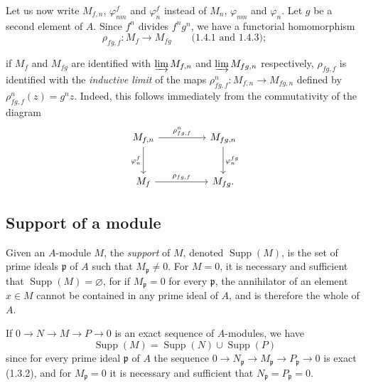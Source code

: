 \begin{env}[1.6.2]
\label{0.1.6.2}
Let us now write $M_{f,n}$, $\varphi_{nm}^f$ and $\varphi_n^f$ instead of
$M_n$, $\varphi_{nm}$ and $\varphi_n$. Let $g$ be a second element of $A$. Since
$f^n$ divides $f^ng^n$, we have a functorial homomorphism
\[
  \rho_{fg,f}:M_f\longrightarrow M_{fg}\qquad\text{(1.4.1 and 1.4.3)};
\]


if $M_f$ and $M_{fg}$ are identified with $\varinjlim M_{f,n}$ and
$\varinjlim M_{fg,n}$ respectively, $\rho_{fg,f}$ is identified with the
\emph{inductive limit} of the maps
$\rho_{fg,f}^n:M_{f,n}\to M_{fg,n}$ defined by
$\rho_{fg,f}^n(z)=g^nz$. Indeed, this follows immediately from the
commutativity of the diagram
\[
\begin{tikzcd}[column sep=huge,row sep=large]
M_{f,n} \arrow[r,"\rho_{fg,f}^n"] \arrow[d,"\varphi_n^f"']
  & M_{fg,n} \arrow[d,"\varphi_n^{fg}"] \\
M_f \arrow[r,"\rho_{fg,f}"]
  & M_{fg}.
\end{tikzcd}
\]
\end{env}

\subsection{Support of a module}
\label{subsection:0.1.7}

\begin{env}[1.7.1]
\label{0.1.7.1}
Given an $A$-module $M$, the \emph{support} of $M$, denoted
$\operatorname{Supp}(M)$, is the set of prime ideals $\mathfrak p$ of $A$
such that $M_{\mathfrak p}\neq0$. For $M=0$, it is necessary and sufficient that
$\operatorname{Supp}(M)=\varnothing$, for if $M_{\mathfrak p}=0$ for every
$\mathfrak p$, the annihilator of an element $x\in M$ cannot be contained in
any prime ideal of $A$, and is therefore the whole of $A$.
\end{env}

\begin{env}[1.7.2]
\label{0.1.7.2}
If $0\to N\to M\to P\to0$ is an exact sequence of $A$-modules, we have
\[
  \operatorname{Supp}(M)=\operatorname{Supp}(N)\cup\operatorname{Supp}(P)
\]
since for every prime ideal $\mathfrak p$ of $A$ the sequence
$0\to N_{\mathfrak p}\to M_{\mathfrak p}\to P_{\mathfrak p}\to0$ is exact
(1.3.2), and for $M_{\mathfrak p}=0$ it is necessary and sufficient that
$N_{\mathfrak p}=P_{\mathfrak p}=0$.
\end{env}

